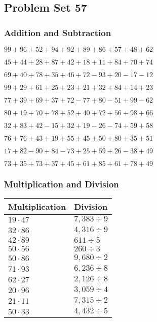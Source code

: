 \hypertarget{problem-set-57}{%
\subsection{Problem Set 57}\label{problem-set-57}}

\hypertarget{addition-and-subtraction}{%
\subsubsection{Addition and
Subtraction}\label{addition-and-subtraction}}

\(99+96+52+94+92+89+86+57+48+62\)

\(45+44+28+87+42+18+11+84+70+74\)

\(69+40+78+35+46+72-93+20-17-12\)

\(99+29+61+25+23+21+32+84+14+23\)

\(77+39+69+37+72-77+80-51+99-62\)

\(80+19+70+78+52+40+72+56+98+66\)

\(32+83+42-15+32+19-26-74+59+58\)

\(76+76+43+19+55+45+50+80+35+51\)

\(17+82-90+84-73+25+59+26-38+49\)

\(73+35+73+37+45+61+85+61+78+49\)

\hypertarget{multiplication-and-division}{%
\subsubsection{Multiplication and
Division}\label{multiplication-and-division}}

\begin{longtable}[]{@{}ll@{}}
\toprule
Multiplication & Division\tabularnewline
\midrule
\endhead
\(19\cdot47\) & \(7,383÷9\)\tabularnewline
\(32\cdot86\) & \(4,316 ÷9\)\tabularnewline
\(42\cdot89\) & \(611÷5\)\tabularnewline
\(50\cdot56\) & \(260÷3\)\tabularnewline
\(50\cdot86\) & \(9,680÷2\)\tabularnewline
\(71\cdot93\) & \(6,236÷8\)\tabularnewline
\(62\cdot27\) & \(2,126÷8\)\tabularnewline
\(20\cdot96\) & \(3,059÷4\)\tabularnewline
\(21\cdot11\) & \(7,315÷2\)\tabularnewline
\(50\cdot33\) & \(4,432÷5\)\tabularnewline
\bottomrule
\end{longtable}
